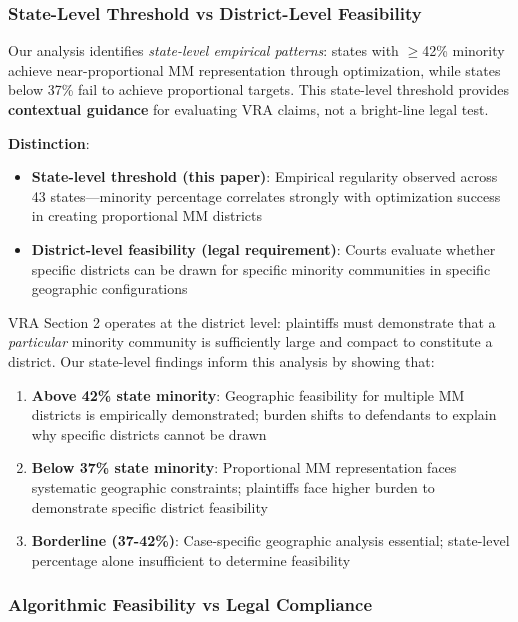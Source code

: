 \subsubsection{State-Level Threshold vs District-Level Feasibility}

Our analysis identifies \emph{state-level empirical patterns}: states with $\geq$42\% minority achieve near-proportional MM representation through optimization, while states below 37\% fail to achieve proportional targets. This state-level threshold provides \textbf{contextual guidance} for evaluating VRA claims, not a bright-line legal test.

\textbf{Distinction}:
\begin{itemize}
    \item \textbf{State-level threshold (this paper)}: Empirical regularity observed across 43 states---minority percentage correlates strongly with optimization success in creating proportional MM districts
    \item \textbf{District-level feasibility (legal requirement)}: Courts evaluate whether specific districts can be drawn for specific minority communities in specific geographic configurations
\end{itemize}

VRA Section 2 operates at the district level: plaintiffs must demonstrate that a \emph{particular} minority community is sufficiently large and compact to constitute a district. Our state-level findings inform this analysis by showing that:

\begin{enumerate}
    \item \textbf{Above 42\% state minority}: Geographic feasibility for multiple MM districts is empirically demonstrated; burden shifts to defendants to explain why specific districts cannot be drawn
    \item \textbf{Below 37\% state minority}: Proportional MM representation faces systematic geographic constraints; plaintiffs face higher burden to demonstrate specific district feasibility
    \item \textbf{Borderline (37-42\%)}: Case-specific geographic analysis essential; state-level percentage alone insufficient to determine feasibility
\end{enumerate}

\subsubsection{Algorithmic Feasibility vs Legal Compliance}

